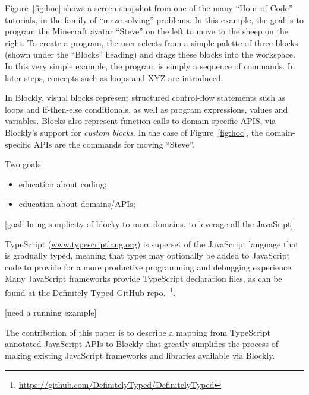 Figure~\ref{fig:hoc} shows a screen snapshot from one of the many 
``Hour of Code'' tutorials, in the family of ``maze solving'' problems.
In this example, the goal is to program the Minecraft avatar ``Steve''
on the left to move to the sheep on the right. To create a program,
the user selects from a simple palette of three blocks
(shown under the ``Blocks'' heading) and drags these blocks into
the workspace. In this very simple example, the
program is simply a sequence of commands. In later steps, 
concepts such as loops and XYZ are introduced.

In Blockly, visual blocks represent structured control-flow statements such as loops 
and if-then-else conditionals, as well as program expressions, values and variables. 
Blocks also represent function calls to domain-specific APIS, via Blockly's support for \emph{custom 
blocks}.  In the case of Figure~\ref{fig:hoc}, the domain-specific APIs are the commands
for moving ``Steve''.



Two goals: 
\begin{itemize}
    \item education about coding; 
    \item education about domains/APIs;
\end{itemize}


[goal: bring simplicity of blocky to more domains, to leverage all the JavaSript]

TypeScript (\url{www.typescriptlang.org}) is superset of the JavaScript language that is gradually typed, 
meaning that types may optionally be added to JavaScript code to provide for a more productive programming 
and debugging experience.  Many JavaScript frameworks provide TypeScript declaration files, as
can be found at the Definitely Typed GitHub repo.~\footnote{\url{https://github.com/DefinitelyTyped/DefinitelyTyped}}.

[need a running example]

The contribution of this paper is to describe a mapping from TypeScript annotated 
JavaScript APIs to Blockly that greatly simplifies 
the process of making existing JavaScript frameworks and libraries available via Blockly.

